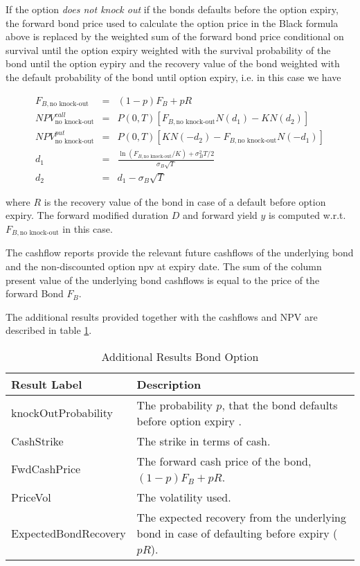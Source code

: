 If the option {\em does not knock out} if the bonds defaults before the option expiry, the forward bond price used to
calculate the option price in the Black formula above is replaced by the weighted sum of the forward bond price
conditional on survival until the option expiry weighted with the survival probability of the bond until the option
eypiry and the recovery value of the bond weighted with the default probability of the bond until option expiry, i.e. in
this case we have

\begin{eqnarray*}
F_{B, \text{no knock-out}} &=& (1-p) F_B + p R \\
NPV^{call}_{\text{no knock-out}}&=& P(0,T)\left[F_{B, \text{no knock-out}}N(d_1)-KN(d_2)\right] \\
NPV^{put}_{\text{no knock-out}}&=& P(0,T)\left[KN(-d_2)-F_{B, \text{no knock-out}}N(-d_1)\right] \\
d_1&=&\frac{\ln(F_{B, \text{no knock-out}}/K)+\sigma_B^2T/2}{\sigma_B\sqrt{T}}\\ 
d_2&=&d_1-\sigma_B\sqrt{T} 
\end{eqnarray*}

where $R$ is the recovery value of the bond in case of a default before option expiry. The forward modified duration $D$
and forward yield $y$ is computed w.r.t. $F_{B, \text{no knock-out}}$ in this case.

The cashflow reports provide the relevant future cashflows of the underlying bond and the non-discounted option npv at expiry date. 
The sum of the column present value of the underlying bond cashflows is equal to the price of the forward Bond $F_B$.

The additional results provided together with the cashflows and NPV are described in table
\ref{tab:additional_results_bond_option}.

\begin{table}[H]
\begin{center}
\begin{tabular}{|p{5cm}|p{10cm}|}
  \hline
  Result Label & Description \\
  \hline
  knockOutProbability & The probability $p$, that the bond defaults before option expiry . \\
  \hline
  CashStrike & The strike in terms of cash. \\
  \hline
  FwdCashPrice & The forward cash price of the bond, $(1-p) F_B + p R$. \\
  \hline
  PriceVol & The volatility used. \\
  \hline
  ExpectedBondRecovery & The expected recovery from the underlying bond in case of defaulting before expiry ($p R$). \\
  \hline
\end{tabular}
\end{center}
\caption{Additional Results Bond Option}
\label{tab:additional_results_bond_option}
\end{table}